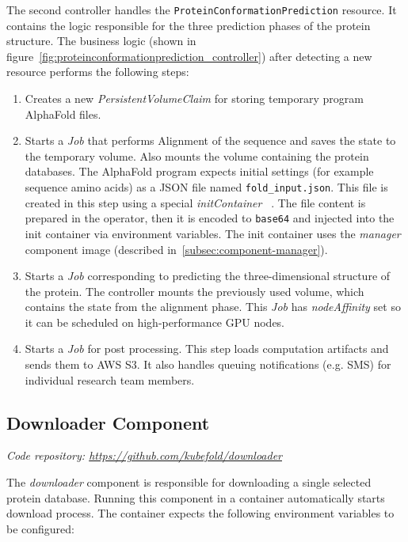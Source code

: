 The second controller handles the \texttt{ProteinConformationPrediction} resource.
It contains the logic responsible for the three prediction phases of the protein structure.
The business logic (shown in figure~\ref{fig:proteinconformationprediction_controller}) after detecting a new resource performs the following steps:
\begin{enumerate}
    \item Creates a new \textit{PersistentVolumeClaim} for storing temporary program AlphaFold files.
    \item Starts a \textit{Job} that performs Alignment of the sequence and saves the state to the temporary volume.
    Also mounts the volume containing the protein databases.
    The AlphaFold program expects initial settings (for example sequence amino acids) as a JSON file named \texttt{fold\_input.json}.
    This file is created in this step using a special \textit{initContainer} ~\cite{k8s_init_containers}.
    The file content is prepared in the operator, then it is encoded to \texttt{base64} and injected into the init container via environment variables.
    The init container uses the \textit{manager} component image (described in~\ref{subsec:component-manager}).
    \item Starts a \textit{Job} corresponding to predicting the three-dimensional structure of the protein.
    The controller mounts the previously used volume, which contains the state from the alignment phase.
    This \textit{Job} has \textit{nodeAffinity} set so it can be scheduled on high-performance GPU nodes.
    \item Starts a \textit{Job} for post processing.
    This step loads computation artifacts and sends them to AWS S3. It also handles queuing notifications (e.g.
    SMS) for individual research team members.
\end{enumerate}

\subsection{Downloader Component}\label{subsec:component-downloader}
\textit{Code repository: \url{https://github.com/kubefold/downloader}}

The \textit{downloader} component is responsible for downloading a single selected protein database.
Running this component in a container automatically starts download process.
The container expects the following environment variables to be configured:

